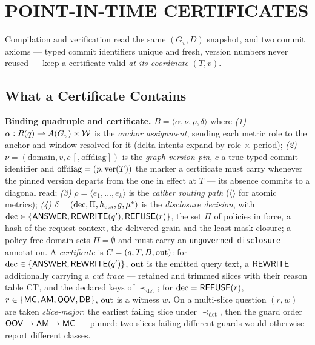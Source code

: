 
\section{POINT-IN-TIME CERTIFICATES}
\label{sec:certificates}

\noindent{} Compilation and verification read the
same $(G_v,D)$ snapshot, and two commit axioms --- typed commit identifiers
unique and fresh, version numbers never reused --- keep a certificate valid
\emph{at its coordinate} $(T,v)$.

\subsection{What a Certificate Contains}
\label{sec:cert:content}

\noindent{}\textbf{Binding quadruple and certificate.}
$B=\langle\alpha,\nu,\rho,\delta\rangle$ where \emph{(1)}
$\alpha:R(q)\rightharpoonup\allowbreak A(G_v)\times\mathcal{W}$ is the \emph{anchor
assignment}, sending each metric role to the anchor and window resolved for it
(delta intents expand by role $\times$ period); \emph{(2)}
$\nu=(\mathrm{domain},v,c\,[,\mathrm{offdiag}])$ is the \emph{graph version
pin}, $c$ a true typed-commit identifier and $\mathrm{offdiag}=(p,\mathrm{ver}(T))$
the marker a certificate must carry whenever the pinned version departs from
the one in effect at $T$ --- its absence commits to a diagonal read; \emph{(3)} $\rho=\langle e_1,\dots,e_k\rangle$ is the \emph{caliber
routing path} ($\langle\rangle$ for atomic metrics); \emph{(4)}
$\delta=(\mathrm{dec},\Pi,h_{\mathrm{ctx}},g,\mu^*)$ is the \emph{disclosure decision}, with
$\mathrm{dec}\in\{\mathsf{ANSWER},\mathsf{REWRITE}(q'),\mathsf{REFUSE}(r)\}$, the set $\Pi$ of policies in force, a
hash of the request context, the delivered grain and the least mask closure; a
policy-free domain sets $\Pi=\emptyset$ and must carry an
\texttt{ungoverned-disclosure} annotation. A \emph{certificate} is
$C=(q,T,B,\mathrm{out})$: for $\mathrm{dec}\in\{\mathsf{ANSWER},\allowbreak\mathsf{REWRITE}(q')\}$, $\mathrm{out}$ is the
emitted
query text, a $\mathsf{REWRITE}$ additionally carrying a \emph{cut trace} --- retained
and trimmed slices with their reason table $\mathrm{CT}$, and the declared keys of
$\prec_{\det}$; for $\mathrm{dec}=\mathsf{REFUSE}(r)$,
$r\in\{\mathsf{MC},\allowbreak\mathsf{AM},\mathsf{OOV},\mathsf{DB}\}$,
$\mathrm{out}$ is a witness $w$. On a multi-slice question $(r,w)$ are taken
\emph{slice-major}: the earliest failing slice under $\prec_{\det}$, then the
guard order $\mathsf{OOV}\to\mathsf{AM}\to\mathsf{MC}$ --- pinned: two slices failing different
guards would otherwise report different classes.

